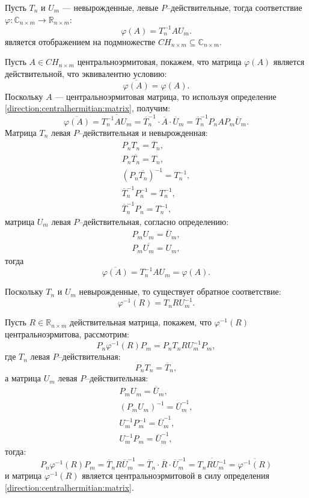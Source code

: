 Пусть $T_n$ и $U_m$ --- невырожденные, левые $P$--действительные, тогда соответствие
$\varphi : \mathbb{C}_{n \times m} \rightarrow \mathbb{R}_{n \times m} $:
\[
    \varphi(A) = T_n^{-1} A U_m .
\]
является отображением на подмножестве $CH_{n \times m} \subseteq \mathbb{C}_{n \times m}$.

Пусть $A \in CH_{n \times m}$ центральноэрмитовая, покажем, что матрица $\varphi(A)$ является действительной, что эквивалентно условию:
\[
    \overline{\varphi(A)} = \varphi(A) .
\]
Поскольку $A$ --- центральноэрмитовая матрица, то используя определение \eqref{direction:centralhermitian:matrix}, получим:
\[
    \overline{\varphi(A)}
    = \overline{T_n^{-1} A U_m}
    = \overline{T}_n^{-1} \cdot \overline{A} \cdot \overline{U}_m
    = \overline{T}_n^{-1} P_n A P_m \overline{U}_m .
\]
Матрица $T_n$ левая $P$--действительная и невырожденная:
\begin{gather*}
    P_n T_n = \overline{T}_n , \\
    P_n \overline{T_n} = T_n , \\
    \left ( P_n \overline{T_n} \right)^{-1} = T_n^{-1} , \\
    \overline{T}_n^{-1} P_n^{-1} = T_n^{-1} , \\
    \overline{T}_n^{-1} P_n = T_n^{-1} ,
\end{gather*}
матрица $U_m$ левая $P$--действительная, согласно определению:
\begin{gather*}
    P_m U_m = \overline{U}_m , \\
    P_m \overline{U_m} = U_m ,
\end{gather*}
тогда
\[
    \overline{\varphi(A)}
    = T_n^{-1} A U_m
    = \varphi(A) .
\]

Поскольку $T_n$ и $U_m$ невырожденные, то существует обратное соответствие:
\[
    \varphi^{-1}(R) = T_n R U_m^{-1} .
\]

Пусть $R \in \mathbb{R}_{n \times m}$ действительная матрица, покажем, что $\varphi^{-1}(R)$ центральноэрмитова, рассмотрим:
\[
    P_n \varphi^{-1}(R) P_m
    = P_n T_n R U_m^{-1} P_m ,
\]
где $T_n$ левая $P$--действительная:
\[
    P_n T_n = \overline{T}_n ,
\]
а матрица $U_m$ левая $P$--действительная:
\begin{gather*}
    P_m U_m = \overline{U}_m , \\
    \left( P_m U_m \right)^{-1} = \overline{U}_m^{-1} , \\
    U_m^{-1} P_m^{-1}  = \overline{U}_m^{-1} , \\
    U_m^{-1} P_m  = \overline{U}_m^{-1} ,
\end{gather*}
тогда:
\[
    P_n \varphi^{-1}(R) P_m
    = \overline{T}_n R \overline{U}_m^{-1}
    = \overline{T}_n \cdot \overline{R} \cdot \overline{U}_m^{-1}
    = \overline{T_n R U_m^{-1}}
    = \overline{\varphi^{-1}(R)}
\]
и матрица $\varphi^{-1}(R)$ является центральноэрмитовой в силу определения \eqref{direction:centralhermitian:matrix}.

